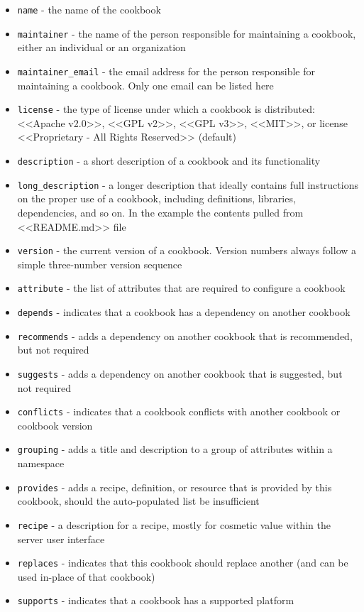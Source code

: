\begin{itemize}
  \item \lstinline!name! - the name of the cookbook
  \item \lstinline!maintainer! - the name of the person responsible for maintaining a cookbook, either an individual or an organization
  \item \lstinline!maintainer_email! - the email address for the person responsible for maintaining a cookbook. Only one email can be listed here
  \item \lstinline!license! - the type of license under which a cookbook is distributed: <<Apache v2.0>>, <<GPL v2>>, <<GPL v3>>, <<MIT>>, or license <<Proprietary - All Rights Reserved>> (default)
  \item \lstinline!description! - a short description of a cookbook and its functionality
  \item \lstinline!long_description! - a longer description that ideally contains full instructions on the proper use of a cookbook, including definitions, libraries, dependencies, and so on. In the example the contents pulled from <<README.md>> file
  \item \lstinline!version! - the current version of a cookbook. Version numbers always follow a simple three-number version sequence
  \item \lstinline!attribute! - the list of attributes that are required to configure a cookbook
  \item \lstinline!depends! - indicates that a cookbook has a dependency on another cookbook
  \item \lstinline!recommends! - adds a dependency on another cookbook that is recommended, but not required
  \item \lstinline!suggests! - adds a dependency on another cookbook that is suggested, but not required
  \item \lstinline!conflicts! - indicates that a cookbook conflicts with another cookbook or cookbook version
  \item \lstinline!grouping! - adds a title and description to a group of attributes within a namespace
  \item \lstinline!provides! - adds a recipe, definition, or resource that is provided by this cookbook, should the auto-populated list be insufficient
  \item \lstinline!recipe! - a description for a recipe, mostly for cosmetic value within the server user interface
  \item \lstinline!replaces! - indicates that this cookbook should replace another (and can be used in-place of that cookbook)
  \item \lstinline!supports! - indicates that a cookbook has a supported platform
\end{itemize}

